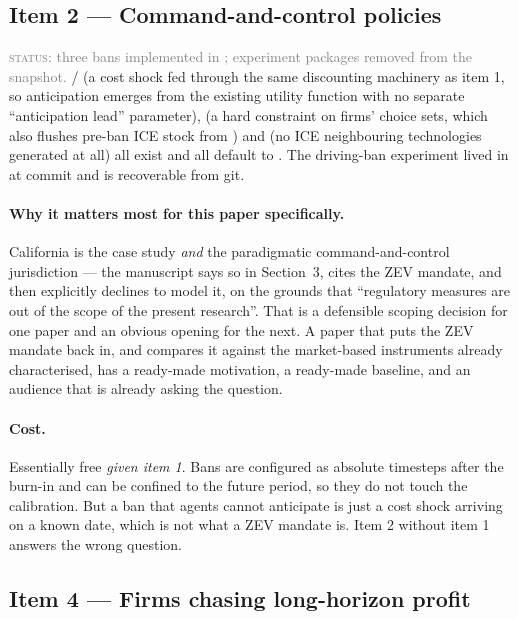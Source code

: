 \documentclass[11pt]{article}
\newcommand{\status}[1]{\textcolor{gray}{\textsc{status:} #1}}
\begin{document}
\subsection{Item 2 --- Command-and-control policies}

\status{three bans implemented in ; experiment packages
removed from the snapshot.}
 /  (a cost
shock fed through the same discounting machinery as item 1, so anticipation
emerges from the existing utility function with no separate
``anticipation lead'' parameter),  (a hard
constraint on firms' choice sets, which also flushes pre-ban ICE stock from
) and  (no ICE
neighbouring technologies generated at all) all exist and all default to
. The driving-ban experiment lived in  at
commit  and is recoverable from git.

\paragraph{Why it matters most for this paper specifically.} California is
the case study \emph{and} the paradigmatic command-and-control jurisdiction
--- the manuscript says so in Section~3, cites the ZEV mandate, and then
explicitly declines to model it, on the grounds that ``regulatory measures
are out of the scope of the present research''. That is a defensible
scoping decision for one paper and an obvious opening for the next. A paper
that puts the ZEV mandate back in, and compares it against the
market-based instruments already characterised, has a ready-made
motivation, a ready-made baseline, and an audience that is already asking
the question.

\paragraph{Cost.} Essentially free \emph{given item 1}. Bans are configured
as absolute timesteps after the burn-in and can be confined to the future
period, so they do not touch the calibration. But a ban that agents cannot
anticipate is just a cost shock arriving on a known date, which is not what
a ZEV mandate is. Item 2 without item 1 answers the wrong question.

\subsection{Item 4 --- Firms chasing long-horizon profit}
\end{document}
